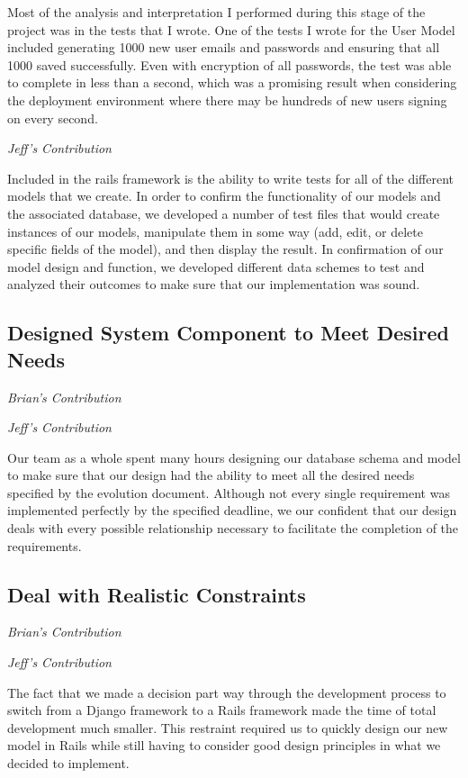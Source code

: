 \documentclass[11pt]{article}
\begin{document}
Most of the analysis and interpretation I performed during this stage of the project was in the tests that I wrote. One of the tests I wrote for the User Model included generating 1000 new user emails and passwords and ensuring that all 1000 saved successfully. Even with encryption of all passwords, the test was able to complete in less than a second, which was a promising result when considering the deployment environment where there may be hundreds of new users signing on every second. 

\textit{Jeff's Contribution}

Included in the rails framework is the ability to write tests for all of the different models that we create.  In order to confirm the functionality of our models and the associated database, we developed a number of test files that would create instances of our models, manipulate them in some way (add, edit, or delete specific fields of the model), and then display the result.  In confirmation of our model design and function, we developed different data schemes to test and analyzed their outcomes to make sure that our implementation was sound.

\subsection{Designed System Component to Meet Desired Needs}

\textit{Brian's Contribution}



\textit{Jeff's Contribution}

Our team as a whole spent many hours designing our database schema and model to make sure that our design had the ability to meet all the desired needs specified by the evolution document.  Although not every single requirement was implemented perfectly by the specified deadline, we our confident that our design deals with every possible relationship necessary to facilitate the completion of the requirements.

\subsection{Deal with Realistic Constraints}

\textit{Brian's Contribution}



\textit{Jeff's Contribution}

The fact that we made a decision part way through the development process to switch from a Django framework to a Rails framework made the time of total development much smaller.  This restraint required us to quickly design our new model in Rails while still having to consider good design principles in what we decided to implement.
\end{document}
